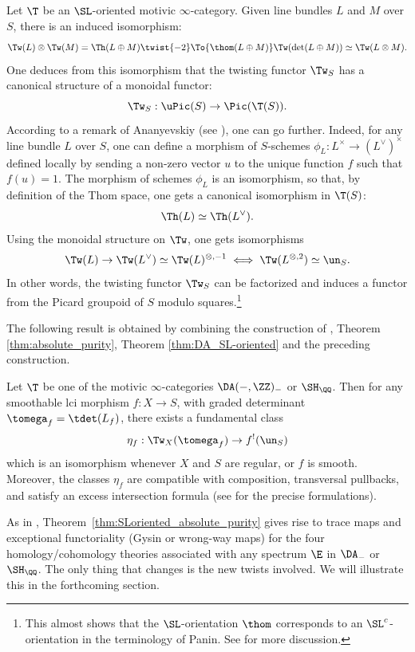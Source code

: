 \begin{num}
Let $\T$ be an $\SL$-oriented motivic $\infty$-category.
Given line bundles $L$ and $M$ over $S$, there is an induced isomorphism:
\[
\Tw(L) \otimes \Tw(M)=\Th(L \oplus M)\twist{-2}
\To{\thom(L \oplus M)} \Tw(\det(L \oplus M))\simeq \Tw(L \otimes M).
\]
One deduces from this isomorphism that the twisting functor $\Tw_S$ has
a canonical structure of a monoidal functor:
\[
\Tw_S:\uPic(S) \to \Pic(\T(S)).
\]
According to a remark of Ananyevskiy (see \cite[Lem.\,4.1]{AnaSL}),
one can go further.
Indeed, for any line bundle $L$ over $S$,
one can define a morphism of $S$-schemes
\hbox{$\phi_L:L^\times \to (L^\vee)^\times$} defined locally by sending a non-zero vector $u$
to the unique function $f$ such that $f(u)=1$.
The morphism of schemes $\phi_L$ is an isomorphism, so that, by definition of the Thom space, one gets
a canonical isomorphism in $\T(S)$:
\[
\Th(L) \simeq \Th(L^\vee).
\]
Using the monoidal structure on $\Tw$,
one gets isomorphisms
\[
\Tw(L) \to \Tw(L^\vee) \simeq \Tw(L)^{\otimes,-1}
\iff
\Tw(L^{\otimes,2}) \simeq \un_S.
\]
In other words, the twisting functor $\Tw_S$ can be factorized and induces a functor from the Picard groupoid
of $S$ modulo squares.\footnote{This almost shows that the $\SL$-orientation $\thom$ corresponds to an $\SL^c$-orientation
in the terminology of Panin. See \cite[Rem.\,4.4]{AnaSL} for more discussion.}
\end{num}

The following result is obtained by combining the construction of \cite{DJK},
Theorem \ref{thm:absolute_purity}, Theorem \ref{thm:DA_SL-oriented} and the preceding
construction.
\begin{thm}\label{thm:SLoriented_absolute_purity}
Let $\T$ be one of the motivic $\infty$-categories $\DA(-,\ZZ)_-$ or $\SH_\QQ$.
Then for any smoothable lci morphism $f:X \to S$,
with graded determinant $\tomega_f=\tdet(L_f)$,
there exists a fundamental class
\[
\eta_f:\Tw_X(\tomega_f) \to f^!(\un_S)
\]
which is an isomorphism whenever $X$ and $S$ are regular, or $f$ is smooth.
Moreover, the classes $\eta_f$ are compatible with composition, transversal pullbacks, and satisfy an excess intersection formula (see \cite{DJK} for the precise formulations).
\end{thm}

\begin{rem}
As in \cite{DJK}, Theorem~\ref{thm:SLoriented_absolute_purity} gives rise to trace maps and exceptional functoriality (Gysin or wrong-way maps) for the four homology/cohomology theories associated with any spectrum $\E$ in $\DA_-$ or $\SH_\QQ$.
The only thing that changes is the new twists involved.
We will illustrate this in the forthcoming section.
\end{rem}

